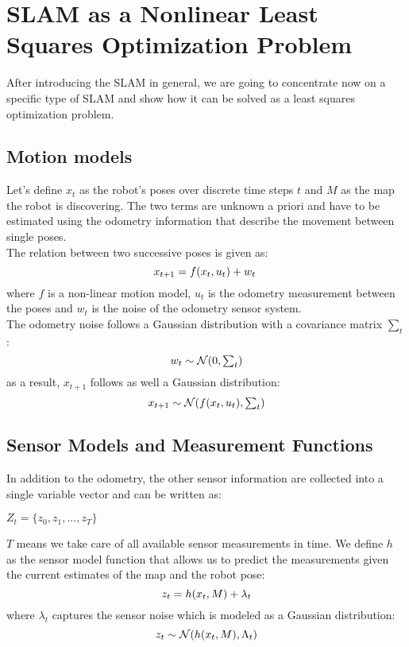 \documentclass[9pt,technote]{IEEEtran}
\begin{document}
\section{SLAM as a Nonlinear Least Squares Optimization Problem}
After introducing the SLAM in general, we are going to concentrate now on a specific type of SLAM and show how it can be solved as a least squares optimization problem.
\subsection{Motion models}
Let's define $x_t$ as the robot's poses over discrete time steps $t$ and $M$ as the map the robot is discovering. The two terms are unknown a priori and have to be estimated using the odometry information that describe the movement between single poses.\\
The relation between two successive poses is given as:
\begin{equation}
\centerline{$x_{t+1} = f(x_t,u_t)+ w_t$ }  
\end{equation}
where $f$ is a non-linear motion model, $u_t$ is the odometry measurement between the poses and $w_t$ is the noise of the odometry sensor system.\\ The odometry noise follows a Gaussian distribution with a covariance matrix $\sum_{t}$:
\begin{equation}
\centerline{$w_t \sim \mathcal{N}(0,\sum_t) $}
\end{equation} 
as a result, $x_{t+1}$ follows as well a Gaussian distribution:
\begin{equation}
\centerline{$x_{t+1} \sim \mathcal{N}(f(x_t,u_t),\sum_t) $}
\end{equation}
\subsection{Sensor Models and Measurement Functions}
In addition to the odometry, the other sensor information are collected into a single variable vector and can be written as:
\newline 
\centerline{$Z_{t} = \{ z_0,z_1, ..., z_T\}$}
$T$ means we take care of all available sensor measurements in time.
We define $h$ as the sensor model function that allows us to predict the measurements given the current estimates of the map and the robot pose:
\begin{equation}
\centerline{$z_t = h(x_t,M) + \lambda_{t} $}
\end{equation}
where $\lambda_{t} $ captures the sensor noise which is modeled as a Gaussian distribution:
\begin{equation}
\centerline{$z_t \sim \mathcal{N}(h(x_t,M),\Lambda_{t}) $}
\end{equation}
\end{document}
